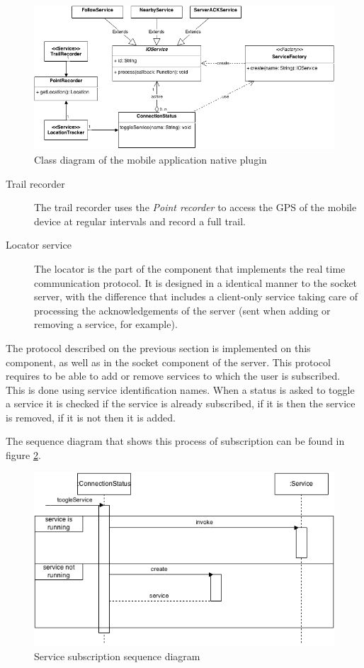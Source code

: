 \begin{figure}[ht]
  \centering
  \includegraphics[width=.7\textwidth]{fig/plugin-component}
  \caption{Class diagram of the mobile application native plugin}
  \label{fig:plugin-component}
\end{figure}

\begin{description}
\item[Trail recorder] The trail recorder uses the \textit{Point recorder} to access the GPS of the mobile device at regular intervals and record a full trail.

\item[Locator service] The locator is the part of the component that implements the real time communication protocol. It is designed in a identical manner to the socket server, with the difference that includes a client-only service taking care of processing the acknowledgements of the server (sent when adding or removing a service, for example).
\end{description}

The protocol described on the previous section is implemented on this component, as well as in the socket component of the server. This protocol requires to be able to add or remove services to which the user is subscribed. This is done using service identification names. When a status is asked to toggle a service it is checked if the service is already subscribed, if it is then the service is removed, if it is not then it is added.

The sequence diagram that shows this process of subscription can be found in figure \ref{fig:plugin-flow}.

\begin{figure}[ht]
  \centering
  \includegraphics[width=.8\textwidth]{fig/plugin-flow}
  \caption{Service subscription sequence diagram}
  \label{fig:plugin-flow}
\end{figure}

